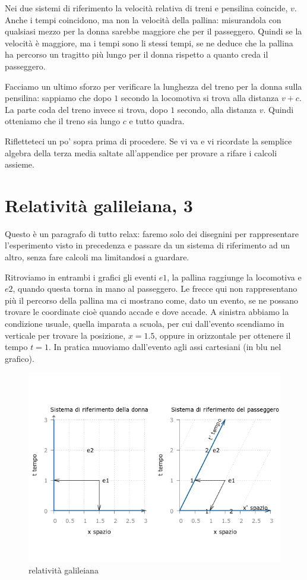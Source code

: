 Nei due sistemi di riferimento la velocità relativa di treni e pensilina coincide, $v$. Anche i tempi coincidono, ma non la velocità della pallina: misurandola con qualsiasi mezzo per la donna sarebbe maggiore che per il passeggero. Quindi se la velocità è maggiore, ma i tempi sono li stessi tempi, se ne deduce che la pallina ha percorso un tragitto più lungo per il donna rispetto a quanto creda il passeggero.

Facciamo un ultimo sforzo per verificare la lunghezza del treno per la donna sulla pensilina: sappiamo che dopo $1$ secondo la locomotiva  si trova alla distanza $v+c$. La parte coda del treno invece si trova, dopo $1$ secondo, alla distanza $v$. Quindi otteniamo che il treno sia lungo $c$ e tutto quadra.

Rifletteteci un po’ sopra prima di procedere. Se vi va e vi ricordate la semplice algebra della terza media  saltate  all’appendice per provare a rifare i calcoli assieme.


\section{Relatività galileiana, 3}

Questo è un paragrafo di tutto relax: faremo solo dei disegnini per rappresentare l’esperimento visto in precedenza e passare da un sistema di riferimento ad un altro, senza fare calcoli ma limitandosi a guardare.

Ritroviamo in entrambi i grafici gli eventi $e1$, la pallina raggiunge la locomotiva e $e2$, quando questa torna in mano al passeggero. Le frecce qui non rappresentano più il percorso della pallina ma ci mostrano come, dato un evento, se ne possano trovare le coordinate cioè quando accade e dove accade. A sinistra abbiamo la condizione usuale, quella imparata a scuola, per cui dall'evento scendiamo in verticale per trovare la posizione, $x=1.5$, oppure in orizzontale per ottenere il tempo $t=1$. In pratica muoviamo dall'evento agli assi cartesiani (in blu nel grafico).

\begin{figure}[h!]
 \centering
 \includegraphics[scale=0.7]{figure/fig5}
 \caption{relatività galileiana}
\end{figure}

